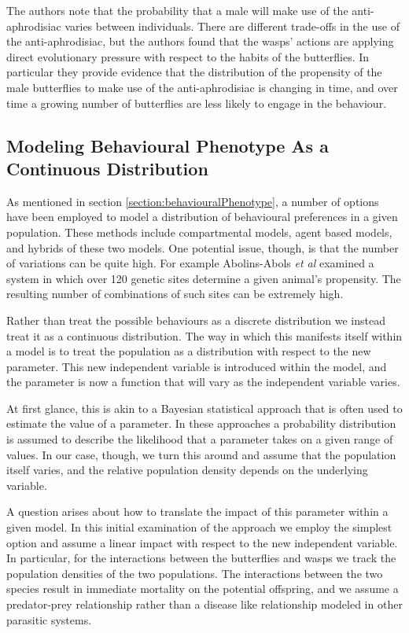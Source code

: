 \documentclass[review]{elsarticle}
\begin{document}
The authors\cite{10.1093/beheco/arq007} note that the probability that
a male will make use of the anti-aphrodisiac varies between
individuals. There are different trade-offs in the use of the
anti-aphrodisiac, but the authors found that the wasps' actions are
applying direct evolutionary pressure with respect to the habits of
the butterflies. In particular they provide evidence that the
distribution of the propensity of the male butterflies to make use of
the anti-aphrodisiac is changing in time, and over time a growing
number of butterflies are less likely to engage in the behaviour.

\subsection{Modeling Behavioural Phenotype As a Continuous
  Distribution}

As mentioned in section \ref{section:behaviouralPhenotype}, a number
of options have been employed to model a distribution of behavioural
preferences in a given population. These methods include compartmental
models, agent based models, and hybrids of these two models. One
potential issue, though, is that the number of variations can be quite
high. For example Abolins-Abols \textit{et al} examined a system in
which over 120 genetic sites determine a given animal's
propensity\cite{doi:10.1111/mec.14878}. The resulting number of
combinations of such sites can be extremely high.

Rather than treat the possible behaviours as a discrete distribution
we instead treat it as a continuous distribution. The way in which
this manifests itself within a model is to treat the population as a
distribution with respect to the new parameter. This new independent
variable is introduced within the model, and the parameter is now a
function that will vary as the independent variable varies.

At first glance, this is akin to a Bayesian statistical approach that
is often used to estimate the value of a
parameter\cite{doi:10.1111/j.1467-9868.2007.00610.x,Fitzpatrick_1991}. In
these approaches a probability distribution is assumed to describe the
likelihood that a parameter takes on a given range of values. In our
case, though, we turn this around and assume that the population
itself varies, and the relative population density depends on the
underlying variable.

A question arises about how to translate the impact of this parameter
within a given model. In this initial examination of the approach we
employ the simplest option and assume a linear impact with respect to
the new independent variable. In particular, for the interactions
between the butterflies and wasps we track the population densities of
the two populations. The interactions between the two species result
in immediate mortality on the potential offspring, and we assume a
predator-prey relationship rather than a disease like relationship
modeled in other parasitic systems. 
\end{document}
